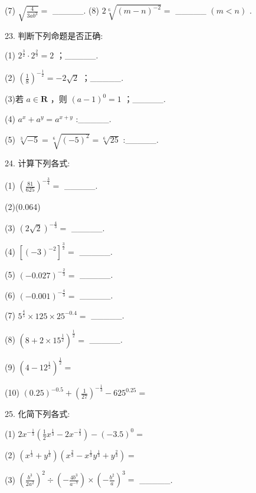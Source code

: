 \documentclass[10pt]{article}
\begin{document}
(7) \(\sqrt{\frac{4}{{3a}{b}^{3}}} =\) \_\_\_\_\_. (8) \(2\sqrt[6]{{\left( m - n\right) }^{-2}} =\) \_\_\_\_\_ \(\left( {m < n}\right)\) .

23. 判断下列命题是否正确:

(1) \({2}^{\frac{3}{2}} \cdot  {2}^{\frac{2}{3}} = 2\) ；\_\_\_\_\_.

(2) \({\left( \frac{1}{8}\right) }^{-\frac{1}{2}} =  - 2\sqrt{2}\) ；\_\_\_\_\_.

(3)若 \(a \in  \mathbf{R}\) ，则 \({\left( a - 1\right) }^{0} = 1\) ；\_\_\_\_\_.

(4) \({a}^{x} + {a}^{y} = {a}^{x + y}\) :\_\_\_\_\_.

(5) \(\sqrt[3]{-5} = \sqrt[6]{{\left( -5\right) }^{2}} = \sqrt[6]{25}\) :\_\_\_\_\_.

24. 计算下列各式:

(1) \({\left( \frac{81}{625}\right) }^{-\frac{3}{4}} =\) \_\_\_\_\_.

(2)(0.064)

(3) \({\left( 2\sqrt{2}\right) }^{-\frac{4}{3}} =\) \_\_\_\_\_.

(4) \({\left\lbrack  {\left( -3\right) }^{-2}\right\rbrack  }^{\frac{3}{2}} =\) \_\_\_\_\_.

(5) \({\left( -{0.027}\right) }^{-\frac{2}{3}} =\) \_\_\_\_\_.

(6) \({\left( -{0.001}\right) }^{-\frac{4}{3}} =\) \_\_\_\_\_.

(7) \({5}^{\frac{4}{5}} \times  {125} \times  {25}^{-{0.4}} =\) \_\_\_\_\_.

(8) \({\left( 8 + 2 \times  {15}^{\frac{1}{2}}\right) }^{\frac{1}{2}} =\) \_\_\_\_\_.

(9) \({\left( 4 - {12}^{\frac{1}{2}}\right) }^{\frac{1}{2}} =\)

(10) \({\left( {0.25}\right) }^{-{0.5}} + {\left( \frac{1}{27}\right) }^{-\frac{1}{3}} - {625}^{0.25} =\)

25. 化简下列各式:

(1) \(2{x}^{-\frac{1}{3}}\left( {\frac{1}{2}{x}^{\frac{1}{3}} - 2{x}^{-\frac{2}{3}}}\right)  - {\left( -{3.5}\right) }^{0} =\)

(2) \(\left( {{x}^{\frac{1}{3}} + {y}^{\frac{1}{3}}}\right) \left( {{x}^{\frac{2}{3}} - {x}^{\frac{1}{3}}{y}^{\frac{1}{3}} + {y}^{\frac{2}{3}}}\right)  =\)

(3) \({\left( \frac{{b}^{3}}{2{a}^{2}}\right) }^{2} \div  \left( {-\frac{4{b}^{3}}{{a}^{-7}}}\right)  \times  {\left( -\frac{{b}^{2}}{a}\right) }^{3} =\) \_\_\_\_\_.
\end{document}
